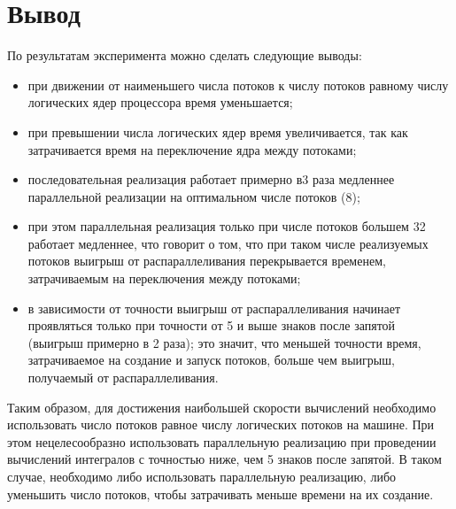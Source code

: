 
\clearpage
\section{Вывод}

По результатам эксперимента можно сделать следующие выводы:
\begin{itemize}[left=\parindent]
    \item при движении от наименьшего числа потоков к числу потоков равному числу логических ядер процессора время уменьшается;
    \item при превышении числа логических ядер время увеличивается, так как затрачивается время на переключение ядра между потоками;
    \item последовательная реализация работает примерно в3 раза медленнее параллельной реализации на оптимальном числе потоков (8);
    \item при этом параллельная реализация только при числе потоков большем 32 работает медленнее, что говорит о том, что при таком числе реализуемых потоков выигрыш от распараллеливания перекрывается временем, затрачиваемым на переключения между потоками;
    \item в зависимости от точности выигрыш от распараллеливания начинает проявляться только при точности от 5 и выше знаков после запятой (выигрыш примерно в 2 раза); это значит, что меньшей точности время, затрачиваемое на создание и запуск потоков, больше чем выигрыш, получаемый от распараллеливания.
\end{itemize}

Таким образом, для достижения наибольшей скорости вычислений необходимо использовать число потоков равное числу логических потоков на машине. При этом нецелесообразно использовать параллельную реализацию при проведении вычислений интегралов с точностью ниже, чем 5 знаков после запятой. В таком случае, необходимо либо использовать параллельную реализацию, либо уменьшить число потоков, чтобы затрачивать меньше времени на их создание.

